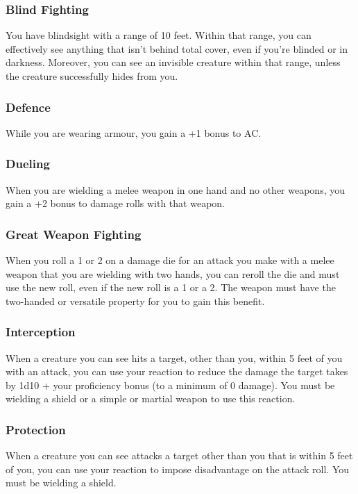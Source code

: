 \subsubsection{Blind Fighting}
You have blindsight with a range of 10 feet.
Within that range, you can effectively see anything that
isn't behind total cover,
even if you're blinded or in darkness.
Moreover, you can see an invisible creature within that range,
unless the creature successfully hides from you.

\subsubsection{Defence}
While you are wearing armour, you gain a +1 bonus to AC.

\subsubsection{Dueling}
When you are wielding a melee weapon in one hand
and no other weapons,
you gain a +2 bonus to damage rolls with that weapon.

\subsubsection{Great Weapon Fighting}
When you roll a 1 or 2 on a damage die for an attack you make
with a melee weapon that you are wielding with two hands,
you can reroll the die and must use the new roll,
even if the new roll is a 1 or a 2.
The weapon must have the two-handed or versatile property
for you to gain this benefit.

\subsubsection{Interception}
When a creature you can see hits a target,
other than you,
within 5 feet of you with an attack,
you can use your reaction to reduce the damage the target takes
by 1d10 + your proficiency bonus (to a minimum of 0 damage).
You must be wielding a shield or a simple or martial weapon
to use this reaction.

\subsubsection{Protection}
When a creature you can see attacks a target other than you
that is within 5 feet of you,
you can use your reaction to impose disadvantage on the attack roll.
You must be wielding a shield.

